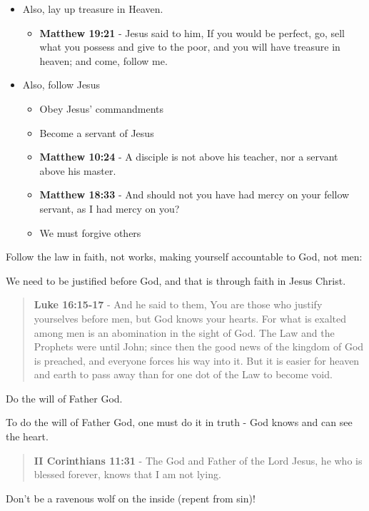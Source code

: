 \documentclass[11pt]{article}
\begin{document}
\begin{itemize}
\begin{itemize}
\begin{itemize}
\end{itemize}
\end{itemize}
\item Also, lay up treasure in Heaven.
\begin{itemize}
\item \textbf{Matthew 19:21} - Jesus said to him, If you would be perfect, go, sell what you possess and give to the poor, and you will have treasure in heaven; and come, follow me.
\end{itemize}
\item Also, follow Jesus
\begin{itemize}
\item Obey Jesus' commandments
\item Become a servant of Jesus
\item \textbf{Matthew 10:24} - A disciple is not above his teacher, nor a servant above his master.
\item \textbf{Matthew 18:33} - And should not you have had mercy on your fellow servant, as I had mercy on you?
\item We must forgive others
\end{itemize}
\end{itemize}

Follow the law in faith, not works, making yourself accountable to God, not men:

We need to be justified before God, and that is through faith in Jesus Christ.

\begin{quote}
\textbf{Luke 16:15-17} - And he said to them, You are those who justify yourselves before men, but God knows your hearts. For what is exalted among men is an abomination in the sight of God.  The Law and the Prophets were until John; since then the good news of the kingdom of God is preached, and everyone forces his way into it. But it is easier for heaven and earth to pass away than for one dot of the Law to become void.
\end{quote}

Do the will of Father God.

To do the will of Father God, one must do it in truth - God knows and can see the heart.

\begin{quote}
\textbf{II Corinthians 11:31} - The God and Father of the Lord Jesus, he who is blessed forever, knows that I am not lying.
\end{quote}

Don't be a ravenous wolf on the inside (repent from sin)!
\end{document}
